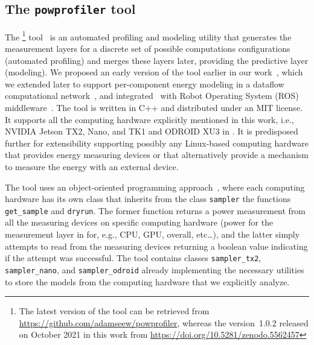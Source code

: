 \subsection{The {\tt powprofiler} tool}
\label{sec:powprof}

The \powprof{}\footnote{The latest version of the tool can be retrieved from \url{https://github.com/adamseew/powprofiler}, whereas the version~1.0.2 released on October 2021 in this work from \url{https://doi.org/10.5281/zenodo.5562457}} tool~\citep{powprofiler} is an automated profiling and modeling utility that generates the measurement layers for a discrete set of possible computations configurations (automated profiling) and merges these layers later, providing the predictive layer (modeling). We proposed an early version of the tool earlier in our work~\citep{teamplayd43,seewald2019coarse}, which we extended later to support per-component energy modeling in a dataflow computational network~\citep{seewald2019component}, and integrated~\citep{zamanakos2020energy} with Robot Operating System (ROS) middleware~\citep{quigley2009ros}. The tool is written in C++ and distributed under an MIT license. It supports all the computing hardware explicitly mentioned in this work, i.e., NVIDIA Jetson TX2, Nano, and TK1 and ODROID XU3 in . It is predisposed further for extensibility supporting possibly any Linux-based computing hardware that provides energy measuring devices or that alternatively provide a mechanism to measure the energy with an external device.

The tool uses an object-oriented programming approach~\citep{stroustrup1988what,wegner1990concepts}, where each computing hardware has its own class that inherits from the class {\small\tt sampler} the functions {\small\tt get\_sample} and {\small\tt dryrun}. The former function returns a power measurement from all the measuring devices on specific computing hardware (power for the measurement layer in  for, e.g., CPU, GPU, overall, etc\dots), and the latter simply attempts to read from the measuring devices returning a boolean value indicating if the attempt was successful. The tool contains classes {\small\tt sampler\_tx2}, {\small\tt sampler\_nano}, and {\small\tt sampler\_odroid} already implementing the necessary utilities to store the models from the computing hardware that we explicitly analyze.

